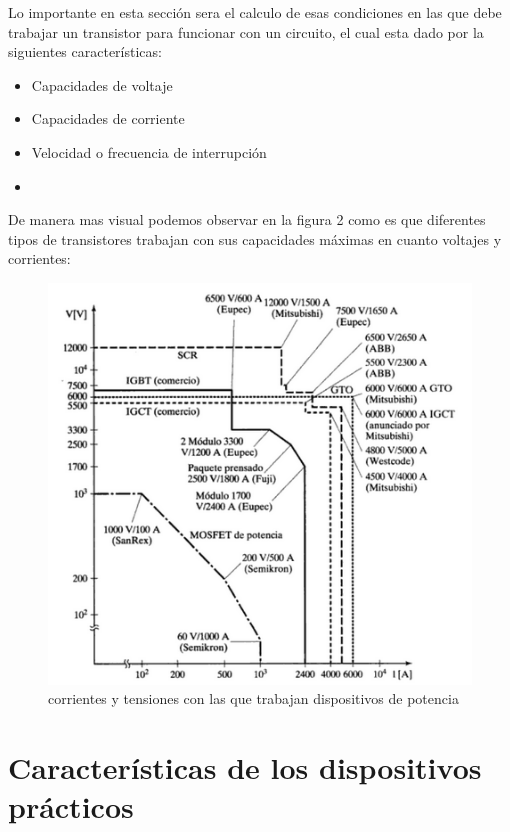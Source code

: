 \documentclass[11pt,a4paper]{article}
\begin{document}
\newpage

Lo importante en esta sección sera el calculo de esas condiciones en las que debe trabajar un transistor para funcionar con un circuito, el cual esta dado por la siguientes características:

\begin{itemize}
\item Capacidades de voltaje
\item Capacidades de corriente
\item Velocidad o frecuencia de interrupción
\item 
\end{itemize}

De manera mas visual podemos observar en la figura 2 como es que diferentes tipos de transistores trabajan con sus capacidades máximas en cuanto voltajes y corrientes:

\begin{figure}[h]
\begin{center}
\includegraphics[scale=0.6]{3.png}
\caption{corrientes y tensiones con las que trabajan dispositivos de potencia}
\end{center}
\end{figure}

\section{Características de los dispositivos prácticos}
\end{document}
